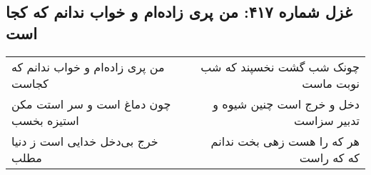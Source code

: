 \begin{center}
\section*{غزل شماره ۴۱۷: من پری زاده‌ام و خواب ندانم که کجا است}
\label{sec:0417}
\begin{longtable}{l p{0.5cm} r}
من پری زاده‌ام و خواب ندانم که کجاست
&&
چونک شب گشت نخسپند که شب نوبت ماست
\\
چون دماغ است و سر استت مکن استیزه بخسب
&&
دخل و خرج است چنین شیوه و تدبیر سزاست
\\
خرج بی‌دخل خدایی است ز دنیا مطلب
&&
هر که را هست زهی بخت ندانم که که راست
\\
\end{longtable}
\end{center}
